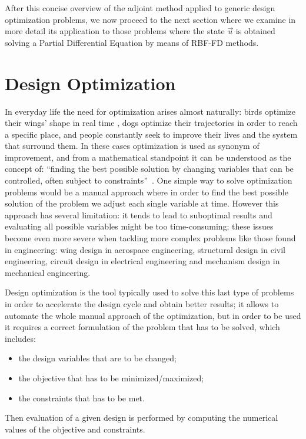 After this concise overview of the adjoint method applied to generic design optimization problems, we now proceed to the next section where we examine in more detail its application to those problems where the state $\vec{u}$ is obtained solving a Partial Differential Equation by means of RBF-FD methods.



\section{Design Optimization}

In everyday life the need for optimization arises almost naturally: birds optimize their wings' shape in real time , dogs optimize their trajectories in order to reach a specific place, and people constantly seek to improve their lives and the system that surround them. In these cases optimization is used as synonym of improvement, and from a mathematical standpoint it can be understood as the concept of: ``finding the best possible solution by changing variables that can be controlled, often subject to constraints''~\cite{Joaquim:engineering_design_opt}.
One simple way to solve optimization problems would be a manual approach where in order to find the best possible solution of the problem we adjust each single variable at time. However this approach has several limitation: it tends to lead to suboptimal results and evaluating all possible variables might be too time-consuming; these issues become even more severe when tackling more complex problems like those found in engineering: wing design in aerospace engineering, structural design in civil engineering, circuit design in electrical engineering and mechanism design in mechanical engineering.

Design optimization is the tool typically used to solve this last type of problems in order to accelerate the design cycle and obtain better results; it allows to automate the whole manual approach of the optimization, but in order to be used it requires a correct formulation of the problem that has to be solved, which includes:
\begin{itemize}
	\item the design variables that are to be changed;
	\item the objective that has to be minimized/maximized;
	\item the constraints that has to be met.
\end{itemize}
Then evaluation of a given design is performed by computing the numerical values of the objective and constraints.

